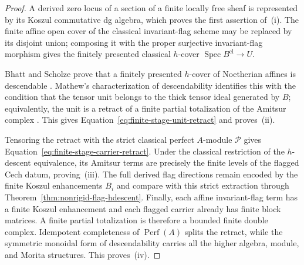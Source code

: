 \documentclass[11pt]{article}
\theoremstyle{definition}
\begin{document}
\begin{proof}
A derived zero locus of a section of a finite locally free sheaf is represented
by its Koszul commutative dg algebra, which proves the first assertion of~(i).
The finite affine open cover of the classical invariant-flag scheme may be
replaced by its disjoint union; composing it with the proper surjective
invariant-flag morphism gives the finitely presented classical $h$-cover
$\operatorname{Spec}B^{\mathrm{cl}}\to U$.

Bhatt and Scholze prove that a finitely presented $h$-cover of Noetherian
affines is descendable \cite[Proposition~11.25]{BhattScholzeWitt}.  Mathew's
characterization of descendability identifies this with the condition that
the tensor unit belongs to the thick tensor ideal generated by $B$; equivalently,
the unit is a retract of a finite partial totalization of the Amitsur complex
\cite[Section~3.3, especially Propositions~3.20--3.22]{MathewGalois}.  This
gives Equation~\eqref{eq:finite-stage-unit-retract} and proves~(ii).

Tensoring the retract with the strict classical perfect $A$-module
$\mathcal P$ gives Equation~\eqref{eq:finite-stage-carrier-retract}.  Under
the classical restriction of the $h$-descent equivalence, its Amitsur terms are
precisely the finite levels of the flagged Cech datum, proving~(iii).  The full
derived flag directions remain encoded by the finite Koszul enhancements
$B_i$ and compare with this strict extraction through
Theorem~\ref{thm:nonrigid-flag-hdescent}.  Finally, each affine
invariant-flag term has a finite Koszul enhancement and each flagged carrier
already has finite block matrices.  A
finite partial totalization is therefore a bounded finite double complex.
Idempotent completeness of $\operatorname{Perf}(A)$ splits the retract, while
the symmetric monoidal form of descendability carries all the higher algebra,
module, and Morita structures.  This proves~(iv).
\end{proof}
\end{document}
